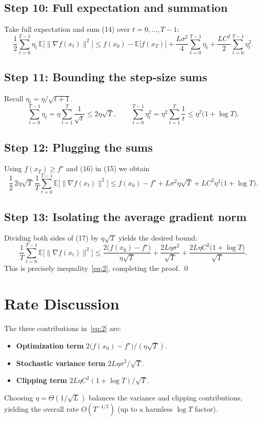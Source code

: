 \documentclass{article}
\newcommand{\E}{\mathbb{E}}
\begin{document}
\subsection*{Step 10: Full expectation and summation}
Take full expectation and sum (14) over $t=0,\dots,T-1$:
\[
\frac{1}{2}\sum_{t=0}^{T-1}\eta_t\,\E\!\bigl[\|\nabla f(x_t)\|^{2}\bigr]
\le
f(x_0)-\E\!\bigl[f(x_T)\bigr]
+\frac{L\sigma^{2}}{4}\sum_{t=0}^{T-1}\eta_t
+\frac{L C^{2}}{2}\sum_{t=0}^{T-1}\eta_t^{2}. \tag{15}
\]

\subsection*{Step 11: Bounding the step‑size sums}
Recall $\eta_t=\eta/\sqrt{t+1}$.
\[
\sum_{t=0}^{T-1}\eta_t
= \eta\sum_{t=1}^{T}\frac{1}{\sqrt{t}}
\le 2\eta\sqrt{T}, \qquad
\sum_{t=0}^{T-1}\eta_t^{2}
= \eta^{2}\sum_{t=1}^{T}\frac{1}{t}
\le \eta^{2}\bigl(1+\log T\bigr). \tag{16}
\]

\subsection*{Step 12: Plugging the sums}
Using $f(x_T)\ge f^\star$ and (16) in (15) we obtain
\[
\frac{1}{2}\,2\eta\sqrt{T}\,
\frac{1}{T}\sum_{t=0}^{T-1}\E\!\bigl[\|\nabla f(x_t)\|^{2}\bigr]
\le
f(x_0)-f^\star
+L\sigma^{2}\eta\sqrt{T}
+L C^{2}\eta^{2}\bigl(1+\log T\bigr). \tag{17}
\]

\subsection*{Step 13: Isolating the average gradient norm}
Dividing both sides of (17) by $\eta\sqrt{T}$ yields the desired bound:
\[
\frac{1}{T}\sum_{t=0}^{T-1}\E\!\bigl[\|\nabla f(x_t)\|^{2}\bigr]
\le
\frac{2\bigl(f(x_0)-f^\star\bigr)}{\eta\sqrt{T}}
+\frac{2L\eta\sigma^{2}}{\sqrt{T}}
+\frac{2L\eta C^{2}\bigl(1+\log T\bigr)}{\sqrt{T}} .
\tag{18}
\]
This is precisely inequality~\eqref{eq:2}, completing the proof. \qed

\section*{Rate Discussion}
The three contributions in~\eqref{eq:2} are:
\begin{itemize}
\item \textbf{Optimization term} $2\bigl(f(x_0)-f^\star\bigr)/(\eta\sqrt{T})$.
\item \textbf{Stochastic variance term} $2L\eta\sigma^{2}/\sqrt{T}$.
\item \textbf{Clipping term} $2L\eta C^{2}(1+\log T)/\sqrt{T}$.
\end{itemize}
Choosing $\eta=\Theta(1/\sqrt{L})$ balances the variance and clipping contributions,
yielding the overall rate $O(T^{-1/2})$ (up to a harmless $\log T$ factor).
\end{document}
